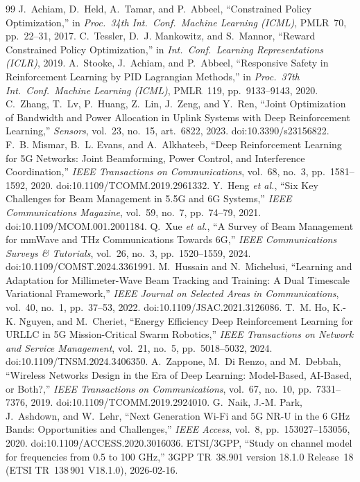 \documentclass[number]{autarticle}
\begin{document}
\begin{thebibliography}{99}
 J.~Achiam, D.~Held, A.~Tamar, and P.~Abbeel, ``Constrained Policy Optimization,'' in \emph{Proc.\ 34th Int.\ Conf.\ Machine Learning (ICML)}, PMLR~70, pp.~22--31, 2017.
 C.~Tessler, D.~J. Mankowitz, and S.~Mannor, ``Reward Constrained Policy Optimization,'' in \emph{Int.\ Conf.\ Learning Representations (ICLR)}, 2019.
 A.~Stooke, J.~Achiam, and P.~Abbeel, ``Responsive Safety in Reinforcement Learning by PID Lagrangian Methods,'' in \emph{Proc.\ 37th Int.\ Conf.\ Machine Learning (ICML)}, PMLR~119, pp.~9133--9143, 2020.
 C.~Zhang, T.~Lv, P.~Huang, Z.~Lin, J.~Zeng, and Y.~Ren, ``Joint Optimization of Bandwidth and Power Allocation in Uplink Systems with Deep Reinforcement Learning,'' \emph{Sensors}, vol.~23, no.~15, art.~6822, 2023. doi:10.3390/s23156822.
 F.~B. Mismar, B.~L. Evans, and A.~Alkhateeb, ``Deep Reinforcement Learning for 5G Networks: Joint Beamforming, Power Control, and Interference Coordination,'' \emph{IEEE Transactions on Communications}, vol.~68, no.~3, pp.~1581--1592, 2020. doi:10.1109/TCOMM.2019.2961332.
 Y.~Heng \emph{et al.}, ``Six Key Challenges for Beam Management in 5.5G and 6G Systems,'' \emph{IEEE Communications Magazine}, vol.~59, no.~7, pp.~74--79, 2021. doi:10.1109/MCOM.001.2001184.
 Q.~Xue \emph{et al.}, ``A Survey of Beam Management for mmWave and THz Communications Towards 6G,'' \emph{IEEE Communications Surveys \& Tutorials}, vol.~26, no.~3, pp.~1520--1559, 2024. doi:10.1109/COMST.2024.3361991.
 M.~Hussain and N.~Michelusi, ``Learning and Adaptation for Millimeter-Wave Beam Tracking and Training: A Dual Timescale Variational Framework,'' \emph{IEEE Journal on Selected Areas in Communications}, vol.~40, no.~1, pp.~37--53, 2022. doi:10.1109/JSAC.2021.3126086.
 T.~M. Ho, K.-K. Nguyen, and M.~Cheriet, ``Energy Efficiency Deep Reinforcement Learning for URLLC in 5G Mission-Critical Swarm Robotics,'' \emph{IEEE Transactions on Network and Service Management}, vol.~21, no.~5, pp.~5018--5032, 2024. doi:10.1109/TNSM.2024.3406350.
 A.~Zappone, M.~Di Renzo, and M.~Debbah, ``Wireless Networks Design in the Era of Deep Learning: Model-Based, AI-Based, or Both?,'' \emph{IEEE Transactions on Communications}, vol.~67, no.~10, pp.~7331--7376, 2019. doi:10.1109/TCOMM.2019.2924010.
 G.~Naik, J.-M. Park, J.~Ashdown, and W.~Lehr, ``Next Generation Wi-Fi and 5G NR-U in the 6 GHz Bands: Opportunities and Challenges,'' \emph{IEEE Access}, vol.~8, pp.~153027--153056, 2020. doi:10.1109/ACCESS.2020.3016036.
 ETSI/3GPP, ``Study on channel model for frequencies from 0.5 to 100 GHz,'' 3GPP TR~38.901 version 18.1.0 Release~18 (ETSI TR~138\,901 V18.1.0), 2026-02-16.
\end{thebibliography}
\end{document}
